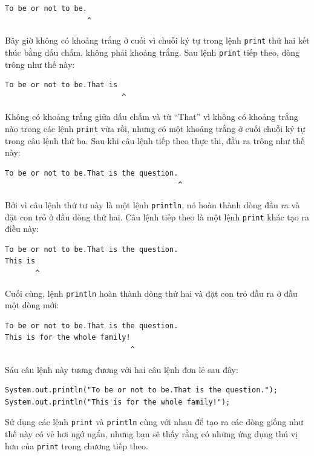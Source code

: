 \begin{verbatim}
To be or not to be.
                   ^
\end{verbatim}

Bây giờ không có khoảng trắng ở cuối vì chuỗi ký tự trong lệnh
\texttt{print} thứ hai kết thúc bằng dấu chấm, không phải khoảng trắng.
Sau lệnh \texttt{print} tiếp theo, dòng trông như thế này:

\begin{verbatim}
To be or not to be.That is 
                           ^
\end{verbatim}

Không có khoảng trắng giữa dấu chấm và từ ``That'' vì không có khoảng
trắng nào trong các lệnh \texttt{print} vừa rồi, nhưng có một khoảng
trắng ở cuối chuỗi ký tự trong câu lệnh thứ ba. Sau khi câu lệnh tiếp
theo thực thi, đầu ra trông như thế này:

\begin{verbatim}
To be or not to be.That is the question.
                                        ^
\end{verbatim}

Bởi vì câu lệnh thứ tư này là một lệnh \texttt{println}, nó hoàn thành
dòng đầu ra và đặt con trỏ ở đầu dòng thứ hai. Câu lệnh tiếp theo là một
lệnh \texttt{print} khác tạo ra điều này:

\begin{verbatim}
To be or not to be.That is the question.
This is
       ^
\end{verbatim}

Cuối cùng, lệnh \texttt{println} hoàn thành dòng thứ hai và đặt con trỏ
đầu ra ở đầu một dòng mới:

\begin{verbatim}
To be or not to be.That is the question.
This is for the whole family!
                             ^
\end{verbatim}

Sáu câu lệnh này tương đương với hai câu lệnh đơn lẻ sau đây:

\begin{verbatim}
System.out.println("To be or not to be.That is the question.");
System.out.println("This is for the whole family!");
\end{verbatim}

Sử dụng các lệnh \texttt{print} và \texttt{println} cùng với nhau để tạo
ra các dòng giống như thế này có vẻ hơi ngớ ngẩn, nhưng bạn sẽ thấy rằng
có những ứng dụng thú vị hơn của \texttt{print} trong chương tiếp theo.


